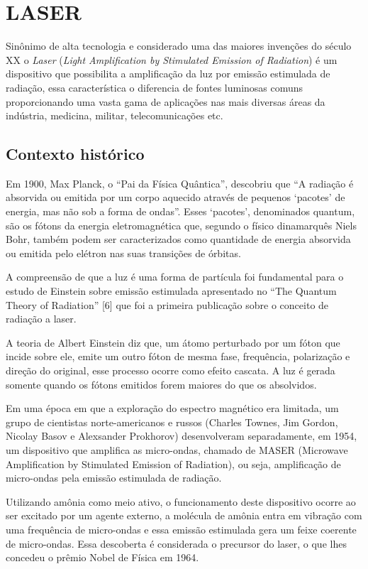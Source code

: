 \section{LASER}

Sinônimo de alta tecnologia e considerado uma das maiores invenções do século XX o \emph{Laser} (\emph{Light Amplification by Stimulated Emission of Radiation}) é um dispositivo que possibilita a amplificação da luz por emissão estimulada de radiação, essa característica o diferencia de fontes luminosas comuns proporcionando uma vasta gama de aplicações nas mais diversas áreas da indústria, medicina, militar, telecomunicações etc.

\subsection{Contexto histórico}

Em 1900, Max Planck, o ``Pai da Física Quântica'', descobriu que ``A radiação é absorvida ou emitida por um corpo aquecido através de pequenos `pacotes' de energia, mas não sob a forma de ondas''. Esses `pacotes', denominados quantum, são os fótons da energia eletromagnética que, segundo o físico dinamarquês Niels Bohr, também podem ser caracterizados como quantidade de energia absorvida ou emitida pelo elétron nas suas transições de órbitas.

A compreensão de que a luz é uma forma de partícula foi fundamental para o estudo de Einstein sobre emissão estimulada apresentado no ``The Quantum Theory of Radiation'' [6] que foi a primeira publicação sobre o conceito de radiação a laser.

A teoria de Albert Einstein diz que, um átomo perturbado por um fóton que incide sobre ele, emite um outro fóton de mesma fase, frequência, polarização e direção do original, esse processo ocorre como efeito cascata. A luz é gerada somente quando os fótons emitidos forem maiores do que os absolvidos.

Em uma época em que a exploração do espectro magnético era limitada, um grupo de cientistas norte-americanos e russos (Charles Townes, Jim Gordon, Nicolay Basov e Alexsander Prokhorov) desenvolveram separadamente, em 1954, um dispositivo que amplifica as micro-ondas, chamado de MASER (Microwave Amplification by Stimulated Emission of Radiation), ou seja, amplificação de micro-ondas pela emissão estimulada de radiação.

Utilizando amônia como meio ativo, o funcionamento deste dispositivo ocorre ao ser excitado por um agente externo, a molécula de amônia entra em vibração com uma frequência de micro-ondas e essa emissão estimulada gera um feixe coerente de micro-ondas. Essa descoberta é considerada o precursor do laser, o que lhes concedeu o prêmio Nobel de Física em 1964.

